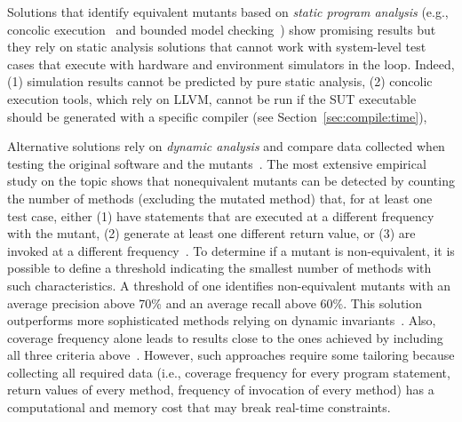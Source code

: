 Solutions that identify equivalent mutants based on \emph{static program analysis} (e.g., concolic execution~\cite{holling2016nequivack,Chekam2021} and bounded model checking~\cite{riener2011test}) 
show promising results  but
they rely on static analysis solutions that cannot work with system-level test cases that execute with hardware and environment simulators in the loop.
Indeed, (1) simulation results cannot be predicted by pure static analysis,  (2) concolic execution tools, which rely on LLVM, cannot be run if the SUT executable should be generated with a specific compiler (see Section~\ref{sec:compile:time}),

Alternative solutions rely on \emph{dynamic analysis} and compare data collected when testing the original software and the mutants~\cite{grun2009impact,schuler2010covering,schuler2013covering,schuler2009efficient}.
The most extensive empirical study on the topic shows that nonequivalent mutants can be detected by counting the number of methods (excluding the mutated method) that, for at least one test case, either (1) have statements that are executed at a different frequency with the mutant, (2) generate at least one different return value, or (3) are invoked at a different frequency~\cite{schuler2013covering}. To determine if a mutant is non-equivalent, it is possible to define a threshold indicating the smallest number of methods with such characteristics. A threshold of one identifies non-equivalent mutants with an average precision above 70\% and an average recall above 60\%. This solution outperforms more sophisticated methods relying on dynamic invariants~\cite{schuler2009efficient}. Also, coverage frequency alone leads to results close to the ones achieved by including all three criteria above~\cite{schuler2013covering}. 
However, such approaches require some tailoring 
because collecting all required data 
(i.e., coverage frequency for every program statement, return values of every method, frequency of invocation of every method) has a computational and memory cost that may break real-time constraints.

